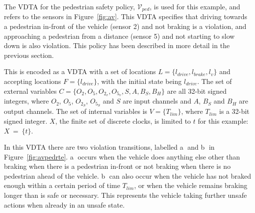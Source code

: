 \begin{example}
	The \ac{VDTA} for the pedestrian safety policy, $\mathcal{V}_{ped}$, is used for this example, and refers to the sensors in Figure~\ref{fig:av}.
	This \ac{VDTA} specifies that driving towards a pedestrian in-front of the vehicle (sensor 2) and not braking is a violation, and approaching a pedestrian from a distance (sensor 5) and not starting to slow down is also violation.
	This policy has been described in more detail in the previous section.
	
	This is encoded as a \ac{VDTA} with a set of locations $L = \{l_{drive}, l_{brake}, l_v\}$ and accepting locations $F = \{l_{drive}\}$, with the initial state being $l_{drive}$.
	The set of external variables $C = \{O_2, O_5, O_{2_v}, O_{5_v}, S, A, B_S, B_H\}$ are all 32-bit signed integers, where $O_2$, $O_5$, $O_{2_S}$, $O_{5_S}$ and $S$ are input channels and $A$, $B_S$ and $B_H$ are output channels.
	The set of internal variables is $V = \{T_{lim}\}$, where $T_{lim}$ is a 32-bit signed integer.
	$X$, the finite set of discrete clocks, is limited to $t$ for this example: $X~=~\{t\}$.
	
	
	In this \ac{VDTA} there are two violation transitions, labelled \textcircled{a} and \textcircled{b} in Figure~\ref{fig:avpedrte}.
	\textcircled{a} occurs when the vehicle does anything else other than braking when there is a pedestrian in-front or not braking when there is no pedestrian ahead of the vehicle.
	\textcircled{b} can also occur when the vehicle has not braked enough within a certain period of time $T_{lim}$, or when the vehicle remains braking longer than is safe or necessary.
	This represents the vehicle taking further unsafe actions when already in an unsafe state.
\end{example}



